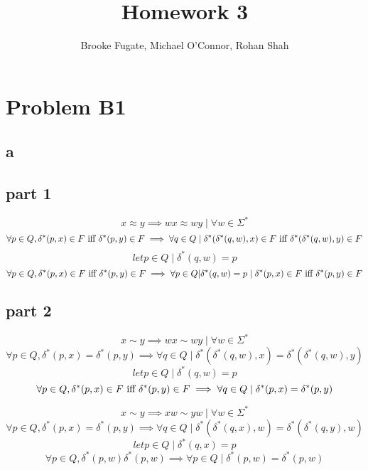 \documentclass[12pt]{article}
\begin{document}
\pagestyle{plain}
\titleformat{\subsection}[runin]
  {\normalfont\large\bfseries}{\thesubsection}{1em}{}

\title{Homework 3}
\author{Brooke Fugate, Michael O'Connor, Rohan Shah}
\date{}

\maketitle

\section*{Problem B1}
\subsection*{a}
\subsection*{part 1}
$$x \approx y \implies wx \approx wy \mid \forall w \in \Sigma^*$$
$$\forall p \in Q, \delta^*(p,x) \in F \hbox{ iff } \delta^*(p,y) \in F \implies \forall q \in Q \mid \delta^*(\delta^*(q,w),x) \in F \hbox{ iff }  \delta^*(\delta^*(q,w),y) \in F$$
$$let p \in Q \mid \delta^*(q,w) = p$$
$$\forall p \in Q, \delta^*(p,x) \in F \hbox{ iff } \delta^*(p,y) \in F \implies \forall p \in Q | \delta^*(q,w) = p \mid \delta^*(p,x) \in F \hbox{ iff } \delta^*(p,y) \in F$$
\subsection*{part 2}
$$x \sim y \implies wx \sim wy \mid \forall w \in \Sigma^*$$
$$\forall p \in Q, \delta^*(p,x) = \delta^*(p,y) \implies \forall q \in Q \mid \delta^*(\delta^*(q,w),x) = \delta^*(\delta^*(q,w),y)$$
$$let p \in Q \mid \delta^*(q,w) = p$$
$$\forall p \in Q, \delta^*(p,x) \in F \hbox{ iff } \delta^*(p,y) \in F \implies \forall q \in Q \mid \delta^*(p,x) =\delta^*(p,y)$$

$$x \sim y \implies xw \sim yw \mid \forall w \in \Sigma^*$$
$$\forall p \in Q, \delta^*(p,x) = \delta^*(p,y) \implies \forall q \in Q \mid \delta^*(\delta^*(q,x),w) = \delta^*(\delta^*(q,y),w)$$
$$let p \in Q \mid \delta^*(q,x) = p$$
$$\forall p \in Q, \delta^*(p,w) \delta^*(p,w) \implies \forall p \in Q \mid \delta^*(p,w) =\delta^*(p,w)$$
\end{document}
